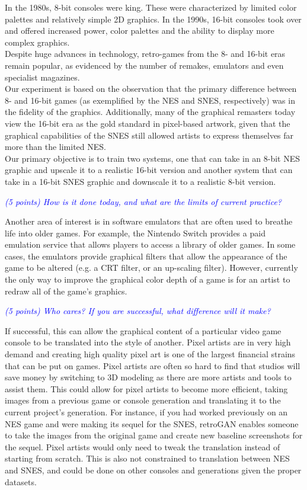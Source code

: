 \documentclass[10pt,twocolumn,letterpaper]{article}
\begin{document}
In the 1980s, 8-bit consoles were king. These were characterized by limited color palettes and relatively simple 2D graphics. In the 1990s, 16-bit consoles took over and offered increased power, color palettes and the ability to display more complex graphics.\\
Despite huge advances in technology, retro-games from the 8- and 16-bit eras remain popular, as evidenced by the number of remakes, emulators and even specialist magazines.\\
Our experiment is based on the observation that the primary difference between 8- and 16-bit games (as exemplified by the NES and SNES, respectively) was in the fidelity of the graphics. Additionally, many of the graphical remasters today view the 16-bit era as the gold standard in pixel-based artwork, given that the graphical capabilities of the SNES still allowed artists to express themselves far more than the limited NES.\\
Our primary objective is to train two systems, one that can take in an 8-bit NES graphic and upscale it to a realistic 16-bit version and another system that can take in a 16-bit SNES graphic and downscale it to a realistic 8-bit version.

\textit{\textcolor{blue}{(5 points) How is it done today, and what are the limits of current practice?}}

Another area of interest is in software emulators that are often used to breathe life into older games. For example, the Nintendo Switch provides a paid emulation service that allows players to access a library of older games. In some cases, the emulators provide graphical filters that allow the appearance of the game to be altered (e.g. a CRT filter, or an up-scaling filter). However, currently the only way to improve the graphical color depth of a game is for an artist to redraw all of the game's graphics.

\textit{\textcolor{blue}{(5 points) Who cares? If you are successful, what difference will it make?}}

If successful, this can allow the graphical content of a particular video game console to be translated into the style of another. Pixel artists are in very high demand and creating high quality pixel art is one of the largest financial strains that can be put on games. Pixel artists are often so hard to find that studios will save money by switching to 3D modeling as there are more artists and tools to assist them. This could allow for pixel artists to become more efficient, taking images from a previous game or console generation and translating it to the current project's generation. For instance, if you had worked previously on an NES game and were making its sequel for the SNES, retroGAN enables someone to take the images from the original game and create new baseline screenshots for the sequel. Pixel artists would only need to tweak the translation instead of starting from scratch. This is also not constrained to translation between NES and SNES, and could be done on other consoles and generations given the proper datasets.
\end{document}
